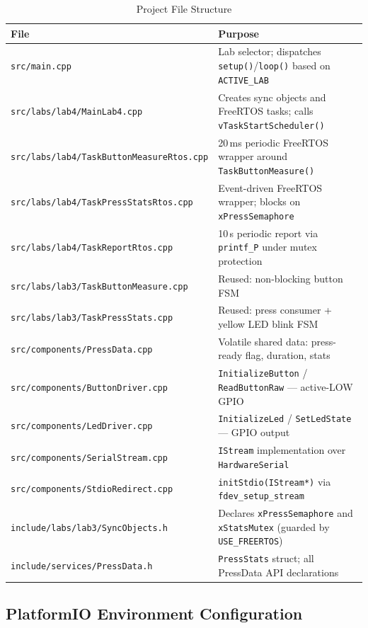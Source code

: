 \documentclass[12pt]{article}
\begin{document}
\begin{table}[H]
\centering
\begin{tabular}{@{}lp{8.2cm}@{}}
\toprule
\textbf{File} & \textbf{Purpose} \\
\midrule
\texttt{src/main.cpp}
  & Lab selector; dispatches \texttt{setup()}/\texttt{loop()} based on \texttt{ACTIVE\_LAB} \\
\texttt{src/labs/lab4/MainLab4.cpp}
  & Creates sync objects and FreeRTOS tasks; calls \texttt{vTaskStartScheduler()} \\
\texttt{src/labs/lab4/TaskButtonMeasureRtos.cpp}
  & 20\,ms periodic FreeRTOS wrapper around \texttt{TaskButtonMeasure()} \\
\texttt{src/labs/lab4/TaskPressStatsRtos.cpp}
  & Event-driven FreeRTOS wrapper; blocks on \texttt{xPressSemaphore} \\
\texttt{src/labs/lab4/TaskReportRtos.cpp}
  & 10\,s periodic report via \texttt{printf\_P} under mutex protection \\
\texttt{src/labs/lab3/TaskButtonMeasure.cpp}
  & Reused: non-blocking button FSM \\
\texttt{src/labs/lab3/TaskPressStats.cpp}
  & Reused: press consumer + yellow LED blink FSM \\
\texttt{src/components/PressData.cpp}
  & Volatile shared data: press-ready flag, duration, stats \\
\texttt{src/components/ButtonDriver.cpp}
  & \texttt{InitializeButton} / \texttt{ReadButtonRaw} — active-LOW GPIO \\
\texttt{src/components/LedDriver.cpp}
  & \texttt{InitializeLed} / \texttt{SetLedState} — GPIO output \\
\texttt{src/components/SerialStream.cpp}
  & \texttt{IStream} implementation over \texttt{HardwareSerial} \\
\texttt{src/components/StdioRedirect.cpp}
  & \texttt{initStdio(IStream*)} via \texttt{fdev\_setup\_stream} \\
\texttt{include/labs/lab3/SyncObjects.h}
  & Declares \texttt{xPressSemaphore} and \texttt{xStatsMutex} (guarded by \texttt{USE\_FREERTOS}) \\
\texttt{include/services/PressData.h}
  & \texttt{PressStats} struct; all PressData API declarations \\
\bottomrule
\end{tabular}
\caption{Project File Structure}
\label{tab:files}
\end{table}

\subsection{PlatformIO Environment Configuration}
\end{document}
